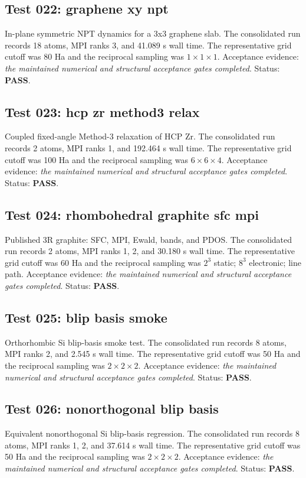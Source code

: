 \documentclass[aps,prb,preprint,superscriptaddress,longbibliography,floatfix]{revtex4-2}
\begin{document}
\subsection{Test 022: graphene xy npt}
In-plane symmetric NPT dynamics for a 3x3 graphene slab. The consolidated run records 18 atoms, MPI ranks 3, and 41.089 s wall time. The representative grid cutoff was 80 Ha and the reciprocal sampling was $1\times1\times1$. Acceptance evidence: \emph{the maintained numerical and structural acceptance gates completed}. Status: \textbf{PASS}.

\subsection{Test 023: hcp zr method3 relax}
Coupled fixed-angle Method-3 relaxation of HCP Zr. The consolidated run records 2 atoms, MPI ranks 1, and 192.464 s wall time. The representative grid cutoff was 100 Ha and the reciprocal sampling was $6\times6\times4$. Acceptance evidence: \emph{the maintained numerical and structural acceptance gates completed}. Status: \textbf{PASS}.

\subsection{Test 024: rhombohedral graphite sfc mpi}
Published 3R graphite: SFC, MPI, Ewald, bands, and PDOS. The consolidated run records 2 atoms, MPI ranks 1, 2, and 30.180 s wall time. The representative grid cutoff was 60 Ha and the reciprocal sampling was $2^3$ static; $8^3$ electronic; line path. Acceptance evidence: \emph{the maintained numerical and structural acceptance gates completed}. Status: \textbf{PASS}.

\subsection{Test 025: blip basis smoke}
Orthorhombic Si blip-basis smoke test. The consolidated run records 8 atoms, MPI ranks 2, and 2.545 s wall time. The representative grid cutoff was 50 Ha and the reciprocal sampling was $2\times2\times2$. Acceptance evidence: \emph{the maintained numerical and structural acceptance gates completed}. Status: \textbf{PASS}.

\subsection{Test 026: nonorthogonal blip basis}
Equivalent nonorthogonal Si blip-basis regression. The consolidated run records 8 atoms, MPI ranks 1, 2, and 37.614 s wall time. The representative grid cutoff was 50 Ha and the reciprocal sampling was $2\times2\times2$. Acceptance evidence: \emph{the maintained numerical and structural acceptance gates completed}. Status: \textbf{PASS}.
\end{document}
